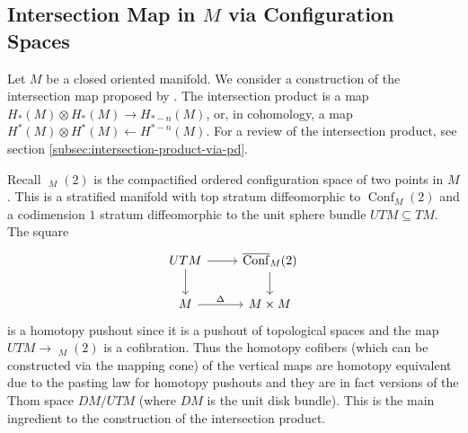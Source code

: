 \documentclass{scrartcl}
\theoremstyle{plain}
\theoremstyle{definition}
\renewcommand{\subset}{\subseteq}
\newcommand{\from}{\leftarrow}
\DeclareMathOperator{\Conf}{Conf}
\DeclareMathOperator{\cConf}{\overline{Conf}}
\begin{document}
\subsection[Intersection Map via Configuration Spaces]{Intersection Map in $M$ via Configuration Spaces}\label{subsec:intersection-in-M-via-conf}

Let $M$ be a closed oriented manifold. We consider a construction of the intersection map proposed by \cite{naef2019string}. The intersection product is a map $H_*(M) \otimes H_*(M) \to H_{*-n}(M)$, or, in cohomology, a map $H^*(M) \otimes H^*(M) \from H^{*-n}(M)$. For a review of the intersection product, see section \ref{subsec:intersection-product-via-pd}.

Recall $\cConf_M(2)$ is the compactified ordered configuration space of two points in $M$. This is a stratified manifold with top stratum diffeomorphic to $\Conf_M(2)$ and a codimension $1$ stratum diffeomorphic to the unit sphere bundle $UTM\subset TM$. The square
\begin{equation}\label{M_pushout_1}
\begin{tikzcd}
    UTM \dar\rar & \cConf_M(2)\dar \\
    M \rar["\Delta"] & M\times M
\end{tikzcd}
\end{equation}
is a homotopy pushout since it is a pushout of topological spaces and the map $UTM \to \cConf_M(2)$ is a cofibration. Thus the homotopy cofibers (which can be constructed via the mapping cone) of the  vertical maps are homotopy equivalent due to the pasting law for homotopy pushouts %
and they are in fact versions of the Thom space $DM / UTM$ (where $DM$ is the unit disk bundle). This is the main ingredient to the construction of the intersection product. 
\end{document}
